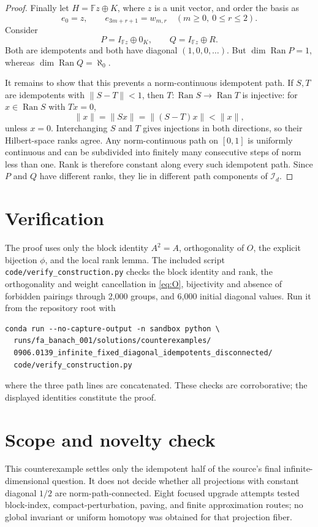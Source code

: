 \documentclass[11pt]{article}
\newcommand{\F}{\mathbb F}
\newcommand{\Ran}{\operatorname{Ran}}
\begin{document}
\begin{proof}
Finally let $H=\F z\oplus K$, where $z$ is a unit vector, and order the basis
as
\[
 e_0=z,\qquad e_{3m+r+1}=w_{m,r}\quad(m\ge0,\ 0\le r\le2).
\]
Consider
\[
 P=I_{\F z}\oplus0_K,\qquad Q=I_{\F z}\oplus R.
\]
Both are idempotents and both have diagonal $(1,0,0,\ldots)$.  But
$\dim\Ran P=1$, whereas $\dim\Ran Q=\aleph_0$.

It remains to show that this prevents a norm-continuous idempotent path.  If
$S,T$ are idempotents with $\|S-T\|<1$, then
$T:\Ran S\to\Ran T$ is injective: for $x\in\Ran S$ with $Tx=0$,
\[
 \|x\|=\|Sx\|=\|(S-T)x\|<\|x\|,
\]
unless $x=0$.  Interchanging $S$ and $T$ gives injections in both directions,
so their Hilbert-space ranks agree.  Any norm-continuous path on $[0,1]$ is
uniformly continuous and can be subdivided into finitely many consecutive
steps of norm less than one.  Rank is therefore constant along every such
idempotent path.  Since $P$ and $Q$ have different ranks, they lie in
different path components of $\mathcal I_d$.
\end{proof}

\section*{Verification}

The proof uses only the block identity $A^2=A$, orthogonality of $O$, the
explicit bijection $\phi$, and the local rank lemma.  The included script
\texttt{code/verify\_construction.py} checks the block identity and rank,
the orthogonality and weight cancellation in \eqref{eq:O}, bijectivity and
absence of forbidden pairings through 2,000 groups, and 6,000 initial
diagonal values.  Run it from the repository root with
\begin{verbatim}
conda run --no-capture-output -n sandbox python \
  runs/fa_banach_001/solutions/counterexamples/
  0906.0139_infinite_fixed_diagonal_idempotents_disconnected/
  code/verify_construction.py
\end{verbatim}
where the three path lines are concatenated.  These checks are corroborative;
the displayed identities constitute the proof.

\section*{Scope and novelty check}

This counterexample settles only the idempotent half of the source's final
infinite-dimensional question.  It does not decide whether all projections
with constant diagonal $1/2$ are norm-path-connected.  Eight focused upgrade
attempts tested block-index, compact-perturbation, paving, and finite
approximation routes; no global invariant or uniform homotopy was obtained for
that projection fiber.
\end{document}
